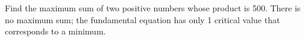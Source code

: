 {Find the maximum sum of two positive numbers whose product is 500.
}
{There is no maximum sum; the fundamental equation has only 1 critical value that corresponds to a minimum.
}

